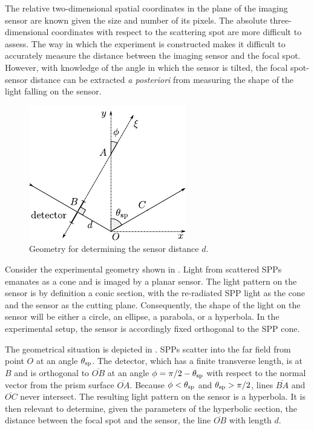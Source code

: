 The relative two-dimensional spatial coordinates in the plane of the
imaging sensor are known given the size and number of its pixels.  The
absolute three-dimensional coordinates with respect to the scattering spot
are more difficult to assess.  The way in which the experiment is
constructed makes it difficult to accurately measure the distance between
the imaging sensor and the focal spot.  However, with knowledge of the
angle in which the sensor is tilted, the focal spot-sensor distance can be extracted
\textit{a posteriori} from measuring the shape of the light falling on the
sensor.
\begin{figure}[ht]
\centering
\includegraphics[keepaspectratio,scale=1.25]{figures/hyperbolageoa.pdf}
\caption{Geometry for determining the sensor distance $d$.}
\label{fig:propgeo}
\end{figure}

Consider the experimental geometry shown in .
Light from scattered SPPs emanates as a cone and is imaged by a planar
sensor.  The light pattern on the sensor is by definition a conic section,
with the re-radiated SPP light as the cone and the sensor as the cutting
plane.  Consequently, the shape of the light on the sensor will be either a
circle, an ellipse, a parabola, or a hyperbola.  In the experimental setup,
the sensor is accordingly fixed orthogonal to the SPP cone.

The geometrical situation is depicted in .  SPPs
scatter into the far field from point $O$ at an angle $\theta_\mathrm{sp}$.  The
detector, which has a finite transverse length, is at $B$ and is orthogonal
to $\overline{OB}$ at an angle $\phi=\pi/2-\theta_\mathrm{sp}$ with respect to the
normal vector from the prism surface $\overline{OA}$.  Because
$\phi<\theta_\mathrm{sp}$ and $\theta_\mathrm{sp}>\pi/2$, lines $\overline{BA}$ and
$\overline{OC}$ never intersect. The resulting light pattern on the sensor is a hyperbola.  It is
then relevant to determine, given the parameters of the hyperbolic section,
the distance between the focal spot and the sensor, the line
$\overline{OB}$ with length $d$.  

